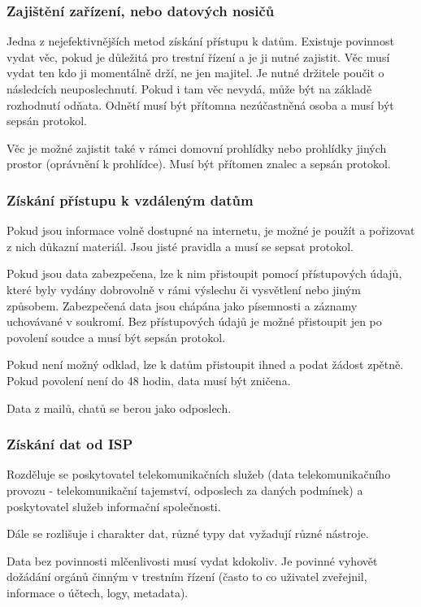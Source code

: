 \subsubsection{Zajištění zařízení, nebo datových nosičů}
Jedna z nejefektivnějších metod získání přístupu k datům. Existuje povinnost vydat věc, pokud je důležitá pro trestní řízení a je ji nutné zajistit. Věc musí vydat ten kdo ji momentálně drží, ne jen majitel. Je nutné držitele poučit o následcích neuposlechnutí. Pokud i tam věc nevydá, může být na základě rozhodnutí odňata. Odnětí musí být přítomna nezúčastněná osoba a musí být sepsán protokol.

Věc je možné zajistit také v rámci domovní prohlídky nebo prohlídky jiných prostor (oprávnění k prohlídce). Musí být přítomen znalec a sepsán protokol.

\subsubsection{Získání přístupu k vzdáleným datům}

Pokud jsou informace volně dostupné na internetu, je možné je použít a pořizovat z nich důkazní materiál. Jsou jisté pravidla a musí se sepsat protokol.

Pokud jsou data zabezpečena, lze k nim přistoupit pomocí přístupových údajů, které byly vydány dobrovolně v rámi výslechu či vysvětlení nebo jiným způsobem. Zabezpečená data jsou chápána jako písemnosti a záznamy uchovávané v soukromí. Bez přístupových údajů je možné přistoupit jen po povolení soudce a musí být sepsán protokol.

Pokud není možný odklad, lze k datům přistoupit ihned a podat žádost zpětně. Pokud povolení není do 48 hodin, data musí být zničena.

Data z mailů, chatů se berou jako odposlech.

\subsubsection{Získání dat od ISP}
Rozděluje se poskytovatel telekomunikačních služeb (data telekomunikačního provozu - telekomunikační tajemství, odposlech za daných podmínek) a poskytovatel služeb informační společnosti.

Dále se rozlišuje i charakter dat, různé typy dat vyžadují různé nástroje.

Data bez povinnosti mlčenlivosti musí vydat kdokoliv. Je povinné vyhovět dožádání orgánů činným v trestním řízení (často to co uživatel zveřejnil, informace o účtech, logy, metadata).

